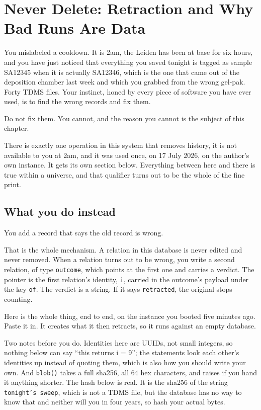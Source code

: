 \chapter{Never Delete: Retraction and Why Bad Runs Are Data}

You mislabeled a cooldown. It is 2am, the Leiden has been at base for six hours, and you have just noticed that everything you saved tonight is tagged as sample SA12345 when it is actually SA12346, which is the one that came out of the deposition chamber last week and which you grabbed from the wrong gel-pak. Forty TDMS files. Your instinct, honed by every piece of software you have ever used, is to find the wrong records and fix them.

Do not fix them. You cannot, and the reason you cannot is the subject of this chapter.

There is exactly one operation in this system that removes history, it is not available to you at 2am, and it was used once, on 17 July 2026, on the author's own instance. It gets its own section below. Everything between here and there is true within a universe, and that qualifier turns out to be the whole of the fine print.

\section{What you do instead}

You add a record that says the old record is wrong.

That is the whole mechanism. A relation in this database is never edited and never removed. When a relation turns out to be wrong, you write a second relation, of type \texttt{outcome}, which points at the first one and carries a verdict. The pointer is the first relation's identity, \texttt{i}, carried in the outcome's payload under the key \texttt{of}. The verdict is a string. If it says \texttt{retracted}, the original stops counting.

Here is the whole thing, end to end, on the instance you booted five minutes ago. Paste it in. It creates what it then retracts, so it runs against an empty database.

Two notes before you do. Identities here are UUIDs, not small integers, so nothing below can say ``this returns i = 9''; the statements look each other's identities up instead of quoting them, which is also how you should write your own. And \texttt{blob()} takes a full sha256, all 64 hex characters, and raises if you hand it anything shorter. The hash below is real. It is the sha256 of the string \texttt{tonight's sweep}, which is not a TDMS file, but the database has no way to know that and neither will you in four years, so hash your actual bytes.

